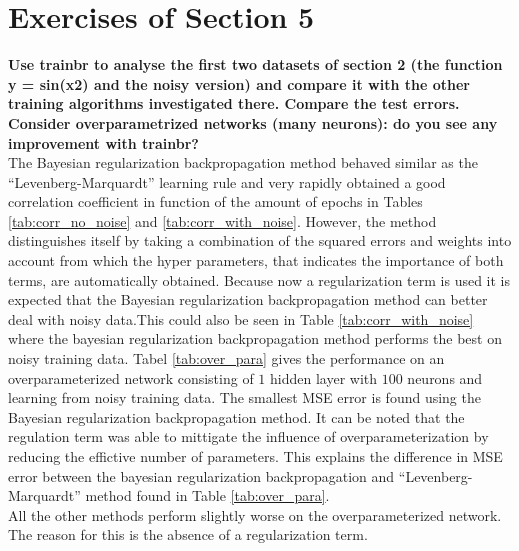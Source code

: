 \documentclass[a4paper,10pt]{article}
\begin{document}
\newpage
\section{Exercises of Section 5}\label{s:ex5}
\textbf{Use trainbr to analyse the first two datasets of section 2 (the function y = sin(x2) and the noisy version) and compare it with the other training algorithms investigated there. Compare the test errors. Consider overparametrized networks (many neurons): do you see any improvement with trainbr?}\\

The Bayesian regularization backpropagation method behaved similar as the ``Levenberg-Marquardt'' learning rule and very rapidly obtained a good correlation coefficient in function of the amount of epochs in Tables \ref{tab:corr_no_noise} and \ref{tab:corr_with_noise}. However, the method distinguishes itself by taking a combination of the squared errors and weights into account from which the hyper parameters, that indicates the importance of both terms, are automatically obtained. Because now a regularization term is used it is expected that the Bayesian regularization backpropagation method can better deal with noisy data.This could also be seen in Table \ref{tab:corr_with_noise} where the bayesian regularization backpropagation method performs the best on noisy training data. Tabel \ref{tab:over_para} gives the performance on an overparameterized network consisting of $ 1 $ hidden layer with $ 100 $ neurons and learning from noisy training data. The smallest MSE error is found using the Bayesian regularization backpropagation method. It can be noted that the regulation term was able to mittigate the influence of overparameterization by reducing the effictive number of parameters. This explains the difference in MSE error between the bayesian regularization backpropagation and ``Levenberg-Marquardt'' method found in Table \ref{tab:over_para}.\\
 All the other methods perform slightly worse on the overparameterized network. The reason for this is the absence of a regularization term.
\end{document}

